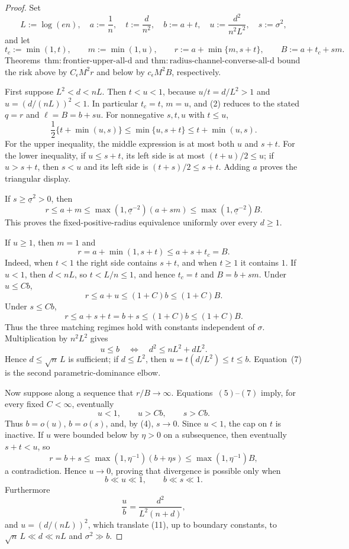 \documentclass{article}
\begin{document}
\begin{proof}
Set
\[
 L:=\log(en),\quad a:=\frac1n,\quad t:=\frac d{n^2},
 \quad b:=a+t,\quad u:=\frac{d^2}{n^2L^2},\quad s:=\sigma^2,
\tag{1}
\]
and let
\[
 t_c:=\min(1,t),\qquad m:=\min(1,u),\qquad
 r:=a+\min\{m,s+t\},\qquad B:=a+t_c+sm.
\tag{2}
\]
Theorems~\(\mathrm{thm:frontier\text{-}upper\text{-}all\text{-}d}\) and \(\mathrm{thm:radius\text{-}channel\text{-}converse\text{-}all\text{-}d}\) bound the risk above by \(C_{\epsilon}M^2r\) and below by \(c_{\epsilon}M^2B\), respectively.

First suppose \(L^2<d<nL\).  Then \(t<u<1\), because \(u/t=d/L^2>1\) and \(u=(d/(nL))^2<1\).  In particular \(t_c=t\), \(m=u\), and (2) reduces to the stated \(q=r\) and \(\ell=B=b+su\).  For nonnegative \(s,t,u\) with \(t\le u\),
\[
 \frac12\{t+\min(u,s)\}
 \le\min\{u,s+t\}
 \le t+\min(u,s).
\tag{3}
\]
For the upper inequality, the middle expression is at most both \(u\) and \(s+t\).  For the lower inequality, if \(u\le s+t\), its left side is at most \((t+u)/2\le u\); if \(u>s+t\), then \(s<u\) and its left side is \((t+s)/2\le s+t\).  Adding \(a\) proves the triangular display.

If \(s\ge\underline\sigma^2>0\), then
\[
 r\le a+m
 \le\max(1,\underline\sigma^{-2})(a+sm)
 \le\max(1,\underline\sigma^{-2})B.
\tag{4}
\]
This proves the fixed-positive-radius equivalence uniformly over every \(d\ge1\).

If \(u\ge1\), then \(m=1\) and
\[
 r=a+\min(1,s+t)\le a+s+t_c=B.
\tag{5}
\]
Indeed, when \(t<1\) the right side contains \(s+t\), and when \(t\ge1\) it contains \(1\).  If \(u<1\), then \(d<nL\), so \(t<L/n\le1\), and hence \(t_c=t\) and \(B=b+sm\).  Under \(u\le Cb\),
\[
 r\le a+u\le(1+C)b\le(1+C)B.
\tag{6}
\]
Under \(s\le Cb\),
\[
 r\le a+s+t=b+s\le(1+C)b\le(1+C)B.
\tag{7}
\]
Thus the three matching regimes hold with constants independent of \(\sigma\).  Multiplication by \(n^2L^2\) gives
\[
 u\le b
 \quad\Longleftrightarrow\quad
 d^2\le nL^2+dL^2.
\tag{8}
\]
Hence \(d\le\sqrt n\,L\) is sufficient; if \(d\le L^2\), then \(u=t(d/L^2)\le t\le b\).  Equation~(7) is the second parametric-dominance elbow.

Now suppose along a sequence that \(r/B\to\infty\).  Equations~\((5)\)--\((7)\) imply, for every fixed \(C<\infty\), eventually
\[
 u<1,\qquad u>Cb,\qquad s>Cb.
\tag{9}
\]
Thus \(b=o(u)\), \(b=o(s)\), and, by (4), \(s\to0\).  Since \(u<1\), the cap on \(t\) is inactive.  If \(u\) were bounded below by \(\eta>0\) on a subsequence, then eventually \(s+t<u\), so
\[
 r=b+s\le\max(1,\eta^{-1})(b+\eta s)
 \le\max(1,\eta^{-1})B,
\tag{10}
\]
a contradiction.  Hence \(u\to0\), proving that divergence is possible only when
\[
 b\ll u\ll1,\qquad b\ll s\ll1.
\tag{11}
\]
Furthermore
\[
 \frac ub=\frac{d^2}{L^2(n+d)},
\tag{12}
\]
and \(u=(d/(nL))^2\), which translate (11), up to boundary constants, to \(\sqrt n\,L\ll d\ll nL\) and \(\sigma^2\gg b\).


\end{proof}
\end{document}
